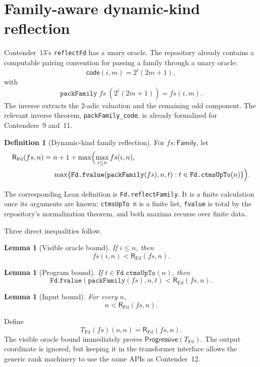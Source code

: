 \documentclass[11pt]{article}
\newtheorem{lemma}[theorem]{Lemma}
\theoremstyle{definition}
\newtheorem{definition}[theorem]{Definition}
\theoremstyle{remark}
\newcommand{\Family}{\mathsf{Family}}
\newcommand{\Prog}{\mathsf{Progressive}}
\newcommand{\RFd}{\mathsf{R}_{\mathrm{Fd}}}
\newcommand{\lean}[1]{\texttt{#1}}
\begin{document}
\section{Family-aware dynamic-kind reflection}

Contender~13's \lean{reflectFd} has a unary oracle.  The repository already
contains a computable pairing convention for passing a family through a unary
oracle:
\[
  \mathsf{code}(i,m)=2^i(2m+1),
\]
with
\[
  \lean{packFamily}\;fs\;(2^i(2m+1))=fs(i,m).
\]
The inverse extracts the 2-adic valuation and the remaining odd component.
The relevant inverse theorem, \lean{packFamily\_code}, is already formalized
for Contenders~9 and~11.

\begin{definition}[Dynamic-kind family reflection]
For \(fs:\Family\), let
\[
\begin{split}
\RFd(fs,n)={}&n+1+\max\Bigl(
  \max_{i\le n}fs(i,n),\\
  &\max\{\lean{Fd.fvalue}(\lean{packFamily}(fs),n,t):
     t\in\lean{Fd.ctmsUpTo}(n)\}\Bigr).
\end{split}
\]
\end{definition}

The corresponding Lean definition is \lean{Fd.reflectFamily}.  It is a finite
calculation once its arguments are known: \lean{ctmsUpTo n} is a finite list,
\lean{fvalue} is total by the repository's normalization theorem, and both
maxima recurse over finite data.

Three direct inequalities follow.

\begin{lemma}[Visible oracle bound]
If \(i\le n\), then
\[
  fs(i,n)<\RFd(fs,n).
\]
\end{lemma}

\begin{lemma}[Program bound]
If \(t\in\lean{Fd.ctmsUpTo}(n)\), then
\[
\lean{Fd.fvalue}(\lean{packFamily}(fs),n,t)<\RFd(fs,n).
\]
\end{lemma}

\begin{lemma}[Input bound]
For every \(n\),
\[
  n<\RFd(fs,n).
\]
\end{lemma}

Define
\[
  T_{\mathrm{Fd}}(fs)(o,n)=\RFd(fs,n).
\]
The visible oracle bound immediately proves \(\Prog(T_{\mathrm{Fd}})\).  The
output coordinate is ignored, but keeping it in the transformer interface
allows the generic rank machinery to use the same APIs as Contender~12.
\end{document}
